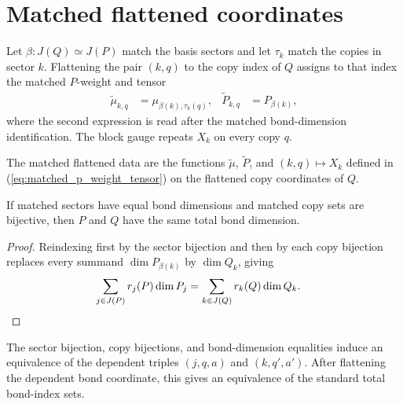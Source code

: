 \section{Matched flattened coordinates}
\label{sec:app_ft_matched_coordinates}

Let $\beta:J(Q)\simeq J(P)$ match the basis sectors and let $\tau_k$ match the
copies in sector $k$. Flattening the pair $(k,q)$ to the copy index of $Q$
assigns to that index the matched $P$-weight and tensor
\begin{align}
    \widetilde\mu_{k,q}
     & =\mu_{\beta(k),\tau_k(q)},
     &
    \widetilde P_{k,q}
     & =P_{\beta(k)},
    \label{eq:matched_p_weight_tensor}
\end{align}
where the second expression is read after the matched bond-dimension
identification. The block gauge repeats $X_k$ on every copy $q$.

\begin{definition}
    \label{def:ft_matched_flat_data}
    \leanok
    The matched flattened data are the functions
    $\widetilde\mu$, $\widetilde P$, and $(k,q)\mapsto X_k$ defined in
    (\ref{eq:matched_p_weight_tensor}) on the flattened copy coordinates of $Q$.
\end{definition}

\begin{lemma}
    \label{lem:ft_total_dim_eq_of_match}
    \leanok
    If matched sectors have equal bond dimensions and matched copy sets are
    bijective, then $P$ and $Q$ have the same total bond dimension.
\end{lemma}

\begin{proof}\leanok
    Reindexing first by the sector bijection and then by each copy bijection
    replaces every summand $\dim P_{\beta(k)}$ by $\dim Q_k$, giving
    \begin{align}
        \sum_{j\in J(P)}r_j(P)\dim P_j
         & =\sum_{k\in J(Q)}r_k(Q)\dim Q_k.
        \notag
    \end{align}
\end{proof}

\begin{definition}
    \label{def:ft_sector_flat_equiv}
    \leanok
    The sector bijection, copy bijections, and bond-dimension equalities induce
    an equivalence of the dependent triples $(j,q,a)$ and $(k,q',a')$. After
    flattening the dependent bond coordinate, this gives an equivalence of the
    standard total bond-index sets.
\end{definition}

